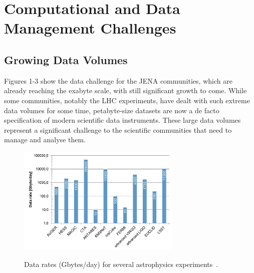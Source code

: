 \section{Computational and Data Management Challenges}

\subsection{Growing Data Volumes}

Figures 1-3 show the data challenge for the JENA communities, which are already reaching the exabyte scale, with still significant growth to come. While some communities, notably the LHC experiments, have dealt with such extreme data volumes for some time, petabyte-size datasets are now a de facto specification of modern scientific data instruments.  These large data volumes represent a significant challenge to the scientific communities that need to manage and analyse them.

\begin{figure}[htbp]
\begin{center}
\includegraphics[width=0.7\textwidth]{figures/Figure1} \\ 
\caption{Data rates (Gbytes/day) for several astrophysics experiments~\cite{berghöfer2015modelcomputingeuropeanastroparticle}.}
\label{figures:Fig1}
\end{center}
\end{figure}

